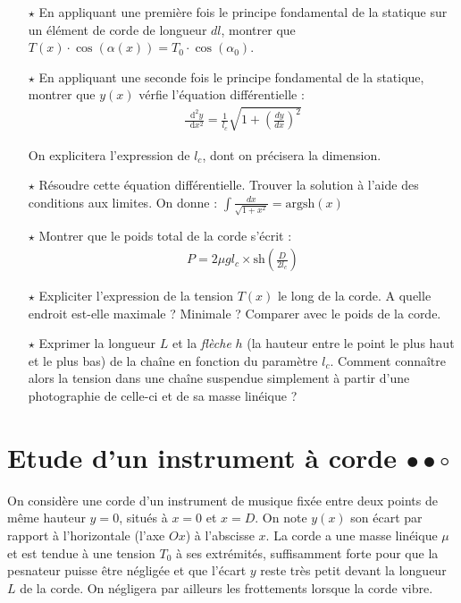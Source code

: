 \documentclass{report}
\newcommand*\dif{\mathop{}\!\mathrm{d}}
\begin{document}
\begin{itemize}

	\item[$\star$] En appliquant une première fois le principe fondamental de la statique sur un élément de corde de longueur $dl$, montrer que $T(x)\cdot\cos(\alpha(x))=T_0\cdot\cos(\alpha_0)$.

	\item[$\star$] En appliquant une seconde fois le principe fondamental de la statique, montrer que $y(x)$ vérfie l'équation différentielle :
	\begin{align*}
		\frac{\dif^2 y}{\dif x^2} =\frac{1}{l_c}\sqrt{1+\left( \frac{dy}{dx}\right)^2}
	\end{align*}	
	
	On explicitera l'expression de $l_c$, dont on précisera la dimension.
	
	\item[$\star$] Résoudre cette équation différentielle. Trouver la solution à l'aide des conditions aux limites. On donne : $\int \frac{dx}{\sqrt{1+x^2}}=\mathrm{argsh}(x)$
	
	\item[$\star$] Montrer que le poids total de la corde s'écrit :
\begin{align*}
		P = 2 \mu g l_c\times\mathrm{sh}\left(\frac{D}{2l_c} \right) 
\end{align*}
	
	\item[$\star$] Expliciter l'expression de la tension $T(x)$ le long de la corde. A quelle endroit est-elle maximale ? Minimale ? Comparer avec le poids de la corde. 
	
	\item[$\star$] Exprimer la longueur $L$ et la \textit{flèche} $h$ (la hauteur entre le point le plus haut et le plus bas) de la chaîne en fonction du paramètre $l_c$. Comment connaître alors la tension dans une chaîne suspendue simplement à partir d'une photographie de celle-ci et de sa masse linéique ?
	
\end{itemize}

\newpage

\section*{Etude d'un instrument à corde $\bullet\bullet\circ$}

On considère une corde d'un instrument de musique fixée entre deux points de même hauteur $y=0$, situés à $x=0$ et $x=D$. On note $y(x)$ son écart par rapport à l'horizontale (l'axe $Ox$) à l'abscisse $x$. La corde a une masse linéique $\mu$ et est tendue à une tension $T_0$ à ses extrémités, suffisamment forte pour que la pesnateur puisse être négligée et que l'écart $y$ reste très petit devant la longueur $L$ de la corde. On négligera par ailleurs les frottements lorsque la corde vibre.
\end{document}

